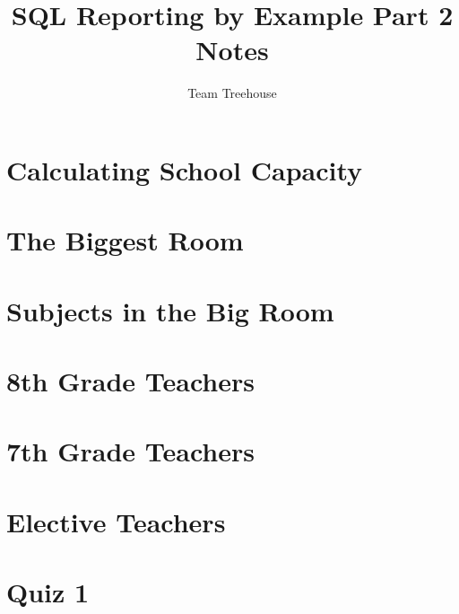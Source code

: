\documentclass[12pt]{article}
\begin{document}
\title{SQL Reporting by Example Part 2 Notes}
\author{Team Treehouse}
\maketitle

\bigskip

\section{Calculating School Capacity}

\bigskip

\section{The Biggest Room}

\bigskip

\section{Subjects in the Big Room}

\bigskip

\section{8th Grade Teachers}

\bigskip

\section{7th Grade Teachers}

\bigskip

\section{Elective Teachers}

\bigskip

\section{Quiz 1}

\bigskip
\end{document}
